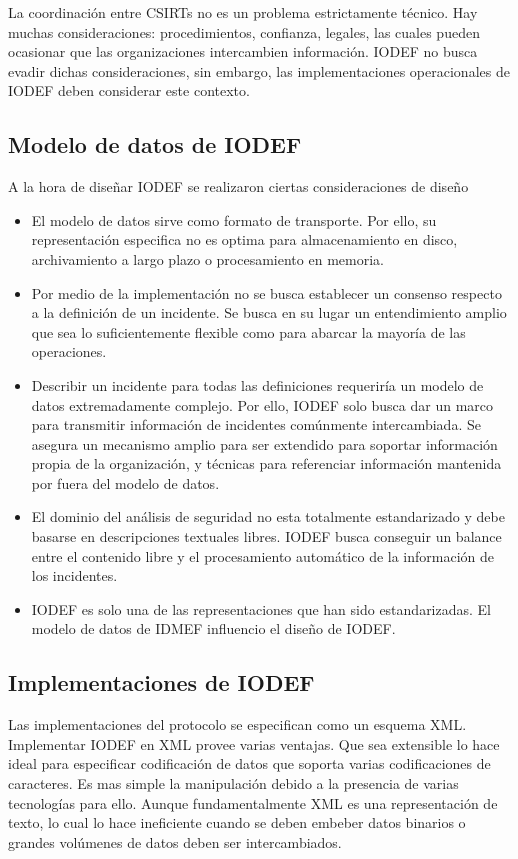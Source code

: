 La coordinación entre CSIRTs no es un problema estrictamente técnico. Hay muchas 
consideraciones: procedimientos, confianza, legales, las cuales pueden ocasionar 
que las organizaciones intercambien información. IODEF no busca evadir dichas 
consideraciones, sin embargo, las implementaciones operacionales de IODEF deben 
considerar este contexto.

\subsection{Modelo de datos de IODEF}
A la hora de diseñar IODEF se realizaron ciertas consideraciones de diseño
\begin{itemize}
  \item El modelo de datos sirve como formato de transporte. Por ello, su 
  representación especifica no es optima para almacenamiento en disco, 
  archivamiento a largo plazo o procesamiento en memoria.
  \item Por medio de la implementación no se busca establecer un consenso 
  respecto a la definición de un incidente. Se busca en su lugar un 
  entendimiento amplio que sea lo suficientemente flexible como para abarcar la 
  mayoría de las operaciones.
  \item Describir un incidente para todas las definiciones requeriría un modelo 
  de datos extremadamente complejo. Por ello, IODEF solo busca dar un marco para 
  transmitir información de incidentes comúnmente intercambiada. Se asegura un 
  mecanismo amplio para ser extendido para soportar información propia de la 
  organización, y técnicas para referenciar información mantenida por fuera del 
  modelo de datos.
  \item El dominio del análisis de seguridad no esta totalmente estandarizado y 
  debe basarse en descripciones textuales libres. IODEF busca conseguir un 
  balance entre el contenido libre y el procesamiento automático 
  de la información de los incidentes.
  \item IODEF es solo una de las representaciones que han sido estandarizadas. 
  El modelo de datos de IDMEF influencio el diseño de IODEF.
\end{itemize}

\subsection{Implementaciones de IODEF}
Las implementaciones del protocolo se especifican como un esquema XML. 
Implementar IODEF en XML provee varias ventajas. Que sea extensible lo hace 
ideal para especificar codificación de datos que soporta varias codificaciones 
de caracteres. Es mas simple la manipulación debido a la presencia de varias 
tecnologías para ello. Aunque fundamentalmente XML es una representación de 
texto, lo cual lo hace ineficiente cuando se deben embeber datos binarios o 
grandes volúmenes de datos deben ser intercambiados.

